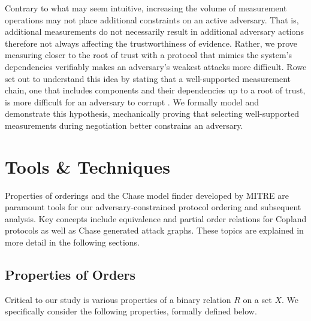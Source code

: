 \documentclass[runningheads]{llncs}
\theoremstyle{definition}
\begin{document}
\noindent Contrary to what may seem intuitive, increasing the volume of measurement operations may not place additional constraints on an active adversary. That is, additional measurements do not necessarily result in additional adversary actions therefore not always affecting the  trustworthiness of evidence. Rather, we prove measuring closer to the root of trust with a protocol that mimics the system's dependencies verifiably makes an adversary's weakest attacks more difficult. Rowe set out to understand this idea by stating that a well-supported measurement chain, one that includes components and their dependencies up to a root of trust, is more difficult for an adversary to corrupt \cite{Rowe:2016:Confining}. We formally model and demonstrate this hypothesis, mechanically proving that selecting well-supported measurements during negotiation better constrains an adversary.



\section{Tools \& Techniques}

Properties of orderings and the Chase model finder developed by MITRE \cite{Ramsdell:2020:Chase} are paramount tools for our adversary-constrained protocol ordering and subsequent analysis. Key concepts include equivalence and partial order relations for Copland protocols as well as Chase generated attack graphs. These topics are explained in more detail in the following sections.

\subsection*{Properties of Orders}

Critical to our study is various properties of a binary relation $R$ on a set $X$. We specifically consider the following properties, formally defined below.
\end{document}
